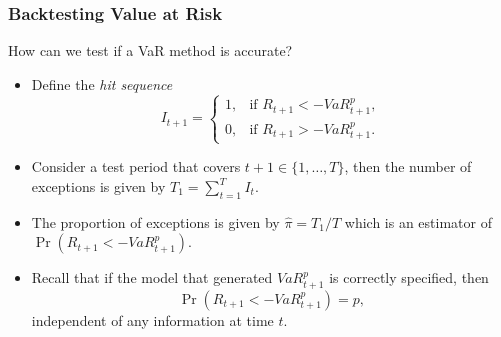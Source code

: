 \begin{frame}%

\frametitle{Backtesting Value at Risk}

How can we test if a VaR method is accurate?

\begin{itemize}
\item Define the \emph{\color{red}hit sequence}%
\begin{equation*}
I_{t+1}=\left\{
\begin{array}{cc}
1, & \text{if }R_{t+1}<-VaR_{t+1}^{p}, \\
0, & \text{if }R_{t+1}>-VaR_{t+1}^{p}.%
\end{array}%
\right.
\end{equation*}

\item Consider a test period that covers $t+1\in \{1,\ldots ,T\}$, then the
number of exceptions is given by $T_{1}=\sum_{t=1}^{T}I_{t}.$

\item The proportion of exceptions is given by $\hat{\pi}=T_{1}/T$ which is
an estimator of $\Pr \left ( R_{t+1}<-VaR_{t+1}^{p}\right )$.

\item Recall that if the model that generated $VaR_{t+1}^{p}$ is correctly
specified, then
\begin{equation*}
\Pr \left ( R_{t+1}<-VaR_{t+1}^{p}\right ) =p,
\end{equation*}
independent of any information at time $t$.
\end{itemize}

\end{frame}%

